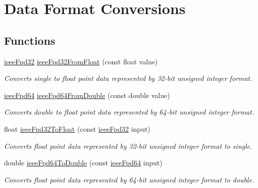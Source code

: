 \hypertarget{group__data__conv}{
\section{Data Format Conversions}
\label{group__data__conv}
}
\subsection*{Functions}
\begin{CompactItemize}
\item 
\hyperlink{data__conv_8h_53faa48a31565fe5491a2cec680d42af}{ieeeFpd32} \hyperlink{group__data__conv_gce626fd81ac4f79dfc488e327842dd62}{ieeeFpd32FromFloat} (const float value)
\begin{CompactList}\small\item\em Converts single to float point data represented by 32-bit unsigned integer format. \item\end{CompactList}\item 
\hyperlink{data__conv_8h_2bfae9897a5537a34f7cb7ec36811596}{ieeeFpd64} \hyperlink{group__data__conv_g004bc0d509fdc686c5a0ebcf1a0db718}{ieeeFpd64FromDouble} (const double value)
\begin{CompactList}\small\item\em Converts double to float point data represented by 64-bit unsigned integer format. \item\end{CompactList}\item 
float \hyperlink{group__data__conv_g05dff20e60a89905d11a28ba3feb6580}{ieeeFpd32ToFloat} (const \hyperlink{data__conv_8h_53faa48a31565fe5491a2cec680d42af}{ieeeFpd32} input)
\begin{CompactList}\small\item\em Converts float point data represented by 32-bit unsigned integer format to single. \item\end{CompactList}\item 
double \hyperlink{group__data__conv_g170f0ab594dab1c4db01008624225f59}{ieeeFpd64ToDouble} (const \hyperlink{data__conv_8h_2bfae9897a5537a34f7cb7ec36811596}{ieeeFpd64} input)
\begin{CompactList}\small\item\em Converts float point data represented by 64-bit unsigned integer format to double. \item\end{CompactList}\item 

\end{CompactItemize}
